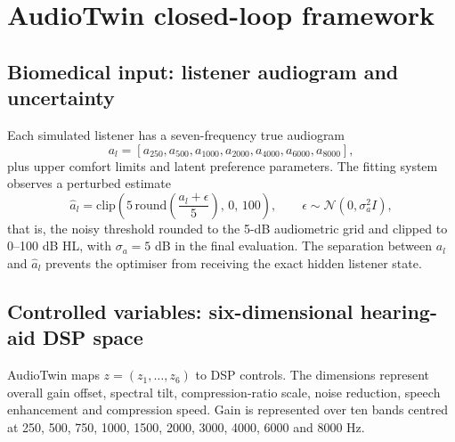 \documentclass[preprint,12pt]{elsarticle}
\begin{document}
\section{AudioTwin closed-loop framework}
\label{sec:framework}

\subsection{Biomedical input: listener audiogram and uncertainty}

Each simulated listener has a seven-frequency true audiogram
\begin{equation}
 a_l=[a_{250},a_{500},a_{1000},a_{2000},a_{4000},a_{6000},a_{8000}],
\end{equation}
plus upper comfort limits and latent preference parameters. The fitting system observes a perturbed estimate
\begin{equation}
    \hat a_l=\mathrm{clip}\!\left(5\,\mathrm{round}\!\left(\frac{a_l+\epsilon}{5}\right),\,0,\,100\right),\qquad \epsilon\sim\mathcal N(0,\sigma_a^2I),
    \label{eq:audiogram-noise}
\end{equation}
that is, the noisy threshold rounded to the 5-dB audiometric grid and clipped to 0--100 dB HL, with $\sigma_a=5$ dB in the final evaluation. The separation between $a_l$ and $\hat a_l$ prevents the optimiser from receiving the exact hidden listener state.

\subsection{Controlled variables: six-dimensional hearing-aid DSP space}

AudioTwin maps $z=(z_1,\ldots,z_6)$ to DSP controls. The dimensions represent overall gain offset, spectral tilt, compression-ratio scale, noise reduction, speech enhancement and compression speed. Gain is represented over ten bands centred at 250, 500, 750, 1000, 1500, 2000, 3000, 4000, 6000 and 8000 Hz.
\end{document}
